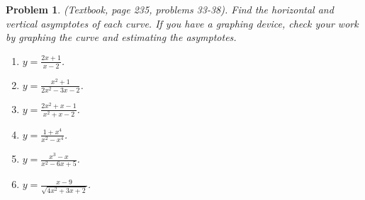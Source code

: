 \documentclass{article}
\newtheorem{problem}{Problem}
\begin{document}
\begin{problem}(Textbook, page 235, problems 33-38).
Find the horizontal and vertical asymptotes of each curve. If you have a graphing device, check your work by graphing the curve and estimating the asymptotes.
\begin{multicols}{3}
\begin{enumerate}
\item $y=\frac{2x+1}{x-2}$.
\item $y=\frac{x^2+1}{2x^2-3x-2}$.
\item $y=\frac{2x^2+x-1}{x^2+x-2}$.
\item $y=\frac{1+x^4}{x^2-x^4}$.
\item $y=\frac{x^3-x}{x^2-6x+5}$.
\item $y=\frac{x-9}{\sqrt{4x^2+3x+2}}$.
\end{enumerate}
\end{multicols}
\end{problem}
\end{document}
